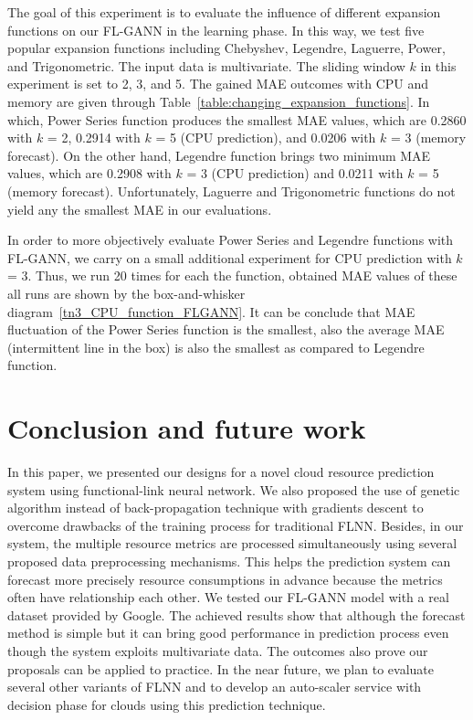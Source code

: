 \documentclass[conference]{IEEEtran}
\begin{document}
The goal of this experiment is to evaluate the influence of different expansion functions on our FL-GANN in the learning phase. In this way, we test five popular expansion functions including Chebyshev, Legendre, Laguerre, Power, and Trigonometric. The input data is multivariate. The sliding window $k$ in this experiment is set to 2, 3, and 5. The gained MAE outcomes with CPU and memory are given through Table~\ref{table:changing_expansion_functions}. In which, Power Series function produces the smallest MAE values, which are 0.2860 with $k$ = 2, 0.2914 with $k$ = 5 (CPU prediction), and 0.0206 with $k$ = 3 (memory forecast). On the other hand, Legendre function brings two minimum MAE values, which are 0.2908 with $k$ = 3 (CPU prediction) and 0.0211 with $k$ = 5 (memory forecast). Unfortunately, Laguerre and Trigonometric functions do not yield any the smallest MAE in our evaluations.

In order to more objectively evaluate Power Series and Legendre functions with FL-GANN, we carry on a small additional experiment for CPU prediction with $k$ = 3. Thus, we run 20 times for each the function, obtained MAE values of these all runs are shown by the box-and-whisker diagram~\ref{tn3_CPU_function_FLGANN}. It can be conclude that MAE fluctuation of the Power Series function is the smallest, also the average MAE (intermittent line in the box) is also the smallest as compared to Legendre function. 

\section{Conclusion and future work}
\label{conclusion}
In this paper, we presented our designs for a novel cloud resource prediction system using functional-link neural network. We also proposed the use of genetic algorithm instead of back-propagation technique with gradients descent to overcome drawbacks of the training process for traditional FLNN. Besides, in our system, the multiple resource metrics are processed simultaneously using several proposed data preprocessing mechanisms. This helps the prediction system can forecast more precisely resource consumptions in advance because the metrics often have relationship each other. We tested our FL-GANN model with a real dataset provided by Google. The achieved results show that although the forecast method is simple but it can bring good performance in prediction process even though the system exploits multivariate data. The outcomes also prove our proposals can be applied to practice. In the near future, we plan to evaluate several other variants of FLNN and to develop an auto-scaler service with decision phase for clouds using this prediction technique.
\end{document}

